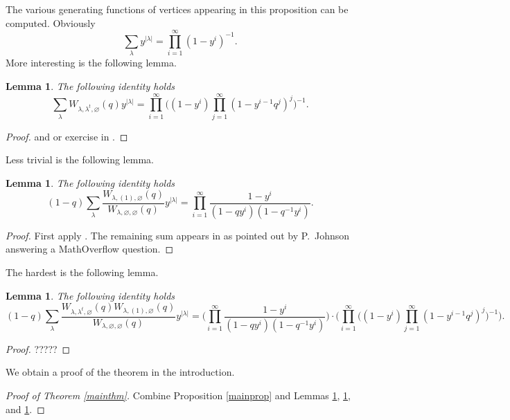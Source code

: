 \documentclass[12pt]{amsart}
\newtheorem{lemma}[theorem]{Lemma}
\theoremstyle{definition}
\theoremstyle{property}
\renewcommand\_{^{}_}
\begin{document}
The various generating functions of vertices appearing in this proposition can be computed. Obviously
\[
\sum_\lambda y^{|\lambda|} = \prod_{i=1}^{\infty} (1-y^i)^{-1}.
\]
More interesting is the following lemma.
\begin{lemma} \label{lem9}
The following identity holds
\[
\sum_{\lambda} W_{\lambda, \lambda^{t}, \varnothing}(q) y^{|\lambda|} = \prod_{i=1}^{\infty} \Big( (1-y^i) \prod_{j = 1}^{\infty} (1-y^{i-1} q^j)^j \Big)^{-1}.
\]
\end{lemma}
\begin{proof}
\cite{Ok-Re-Va} and \cite{Macdonald} or exercise in \cite{Sta}.
\end{proof}
Less trivial is the following lemma.
\begin{lemma} \label{lem10}
The following identity holds
\[
(1-q) \sum_{\lambda} \frac{W_{\lambda, (1), \varnothing}(q)}{W_{\lambda,\varnothing,\varnothing}(q)} y^{|\lambda|} = \prod_{i=1}^{\infty} \frac{1-y^i}{(1-q y^i)(1-q^{-1} y^i)} .
\]
\end{lemma}
\begin{proof}
First apply \cite{Ok-Re-Va}. The remaining sum appears in \cite{BO} as pointed out by P.~Johnson answering a MathOverflow question. 
\end{proof}
The hardest is the following lemma.
\begin{lemma} \label{lem11}
The following identity holds
\[
(1-q) \sum_{\lambda} \frac{W_{\lambda, \lambda^t, \varnothing}(q) W_{\lambda, (1), \varnothing}(q)}{W_{\lambda,\varnothing,\varnothing}(q)} y^{|\lambda|} = \Bigg( \prod_{i=1}^{\infty} \frac{1-y^i}{(1-q y^i)(1-q^{-1} y^i)} \Bigg) \cdot \Bigg( \prod_{i=1}^{\infty} \Big( (1-y^i) \prod_{j = 1}^{\infty} (1-y^{i-1} q^j)^j \Big)^{-1} \Bigg).
\]
\end{lemma}
\begin{proof}
?????
\end{proof}
We obtain a proof of the theorem in the introduction.
\begin{proof} [Proof of Theorem \ref{mainthm}]
Combine Proposition \ref{mainprop} and Lemmas \ref{lem9}, \ref{lem10}, and \ref{lem11}. 
\end{proof}

\newpage

      


\end{document}
